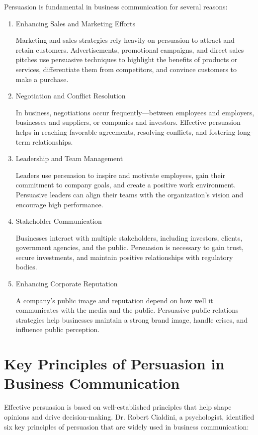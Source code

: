 \documentclass[a4paper]{article}
\begin{document}
Persuasion is fundamental in business communication for several reasons:
\begin{enumerate}
\item Enhancing Sales and Marketing Efforts

Marketing and sales strategies rely heavily on persuasion to attract and retain customers. Advertisements, promotional campaigns, and direct sales pitches use persuasive techniques to highlight the benefits of products or services, differentiate them from competitors, and convince customers to make a purchase.

\item Negotiation and Conflict Resolution

In business, negotiations occur frequently—between employees and employers, businesses and suppliers, or companies and investors. Effective persuasion helps in reaching favorable agreements, resolving conflicts, and fostering long-term relationships.

\item Leadership and Team Management

Leaders use persuasion to inspire and motivate employees, gain their commitment to company goals, and create a positive work environment. Persuasive leaders can align their teams with the organization's vision and encourage high performance.

\item Stakeholder Communication

Businesses interact with multiple stakeholders, including investors, clients, government agencies, and the public. Persuasion is necessary to gain trust, secure investments, and maintain positive relationships with regulatory bodies.

\item Enhancing Corporate Reputation

A company's public image and reputation depend on how well it communicates with the media and the public. Persuasive public relations strategies help businesses maintain a strong brand image, handle crises, and influence public perception.
\end{enumerate}

\section{Key Principles of Persuasion in Business Communication}

Effective persuasion is based on well-established principles that help shape opinions and drive decision-making. Dr. Robert Cialdini, a psychologist, identified six key principles of persuasion that are widely used in business communication:
\end{document}
